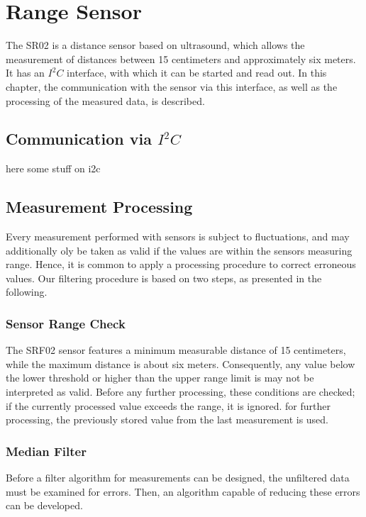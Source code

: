  \chapter{Range Sensor}
 \label{cha:rangeSensor}

The SR02 is a distance sensor based on ultrasound, which 
allows the measurement of distances between 15 centimeters and approximately
six meters. It has an $I^{2}C$ interface, with which it can be started and read 
out. In this chapter, the communication with the sensor via this interface,
as well as the processing of the measured data, is described.

\section{Communication via $I^{2}C$}
\label{sec:sensorI2C}

here some stuff on i2c


\section{Measurement Processing}
\label{sec:filter}

Every measurement performed with sensors is subject to fluctuations, and 
may additionally oly be taken as valid if the values are within the sensors
measuring range. Hence, it is common to apply a processing procedure to 
correct erroneous values. Our filtering procedure is based on two steps, 
as presented in the following.

\subsection{Sensor Range Check}
\label{subsec:sensorRangeCheck}

The SRF02 sensor features a minimum measurable distance of 15 centimeters, 
while the maximum distance is about six meters. Consequently, any value
below the lower threshold or higher than the upper range limit is may not 
be interpreted as valid. Before any further processing, these conditions
are checked; if the currently processed value exceeds the range, it is ignored.
for further processing, the previously stored value from the last measurement 
is used.

\subsection{Median Filter}
\label{subsec:medianFilter}
Before a filter algorithm for measurements can be designed, the unfiltered
data must be examined for errors. Then, an algorithm capable of reducing 
these errors can be developed. 

